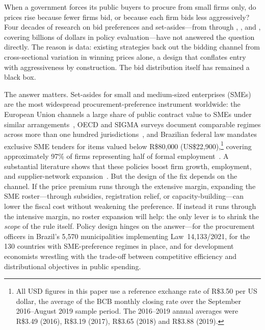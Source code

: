 \introheading

When a government forces its public buyers to procure from small firms only, do prices rise because fewer firms bid, or because each firm bids less aggressively? Four decades of research on bid preferences and set-asides---from \citet{marion2007} through \citet{krasnokutskaya2011}, \citet{athey2013}, and \citet{nakabayashi2013}, covering billions of dollars in policy evaluation---have not answered the question directly. The reason is data: existing strategies back out the bidding channel from cross-sectional variation in winning prices alone, a design that conflates entry with aggressiveness by construction. The bid distribution itself has remained a black box.

The answer matters. Set-asides for small and medium-sized enterprises (SMEs) are the most widespread procurement-preference instrument worldwide: the European Union channels a large share of public contract value to SMEs under similar arrangements~\citep{pwc2014,loader2013,loader2015}, OECD and SIGMA surveys document comparable regimes across more than one hundred jurisdictions~\citep{oecd2018,sigma2016,hoekman2020}, and Brazilian federal law mandates exclusive SME tenders for items valued below R\$80{,}000 (US\$22{,}900),\footnote{All USD figures in this paper use a reference exchange rate of R\$3.50 per US dollar, the average of the BCB monthly closing rate over the September 2016--August 2019 sample period. The 2016--2019 annual averages were R\$3.49 (2016), R\$3.19 (2017), R\$3.65 (2018) and R\$3.88 (2019).} covering approximately 97\% of firms representing half of formal employment~\citep{bastos2018, thai2017, bosio2022}. A substantial literature shows that these policies boost firm growth, employment, and supplier-network expansion~\citep{mel2008,freedman2013,szerman2023,cardoza2016,fafchamps2014,mckenzie2015,ferraz2016,cabral2017}. But the design of the fix depends on the channel. If the price premium runs through the extensive margin, expanding the SME roster---through subsidies, registration relief, or capacity-building---can lower the fiscal cost without weakening the preference. If instead it runs through the intensive margin, no roster expansion will help: the only lever is to shrink the \emph{scope} of the rule itself. Policy design hinges on the answer---for the procurement officers in Brazil's 5{,}570 municipalities implementing Law~14{,}133/2021, for the 130 countries with SME-preference regimes in place, and for development economists wrestling with the trade-off between competitive efficiency and distributional objectives in public spending.

